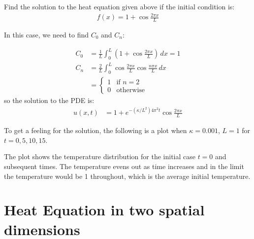 \begin{example}
Find the solution to the heat equation given above if the initial condition is:
% 
\begin{align*}
f(x) = 1+\cos \frac{2\pi x}{L}  
\end{align*}

\solution

In this case, we need to find $C_0$ and $C_n$:

\begin{align*}
C_0 & = \frac{1}{L} \int_0^L (1+ \cos \frac{2\pi x}{L}) \, dx  = 1 \\
C_n& = \frac{2}{L} \int_0^L \cos \frac{2\pi x}{L} \cos \frac{n \pi x}{L} \, dx \\
& = \begin{cases}
1 & \text{if $n=2$} \\
0 & \text{otherwise} 
\end{cases}
\end{align*}
so the solution to the PDE is:
%
\begin{align*}
u(x,t) & = 1 + e^{-(\kappa/L^2) 4 \pi^2 t } \cos \frac{2\pi x}{L} 
\end{align*}

To get a feeling for the solution, the following is a plot when $\kappa=0.001$, $L=1$ for $t=0,5,10,15$.  


\begin{center}
\end{center}

The plot shows the temperature distribution for the initial case $t=0$ and subsequent times.  The temperature evens out as time increases and in the limit the temperature would be 1 throughout, which is the average initial temperature.  

\end{example}


\section{Heat Equation in two spatial dimensions}


